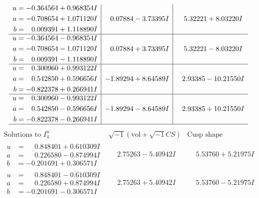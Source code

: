 \documentclass[1p]{elsarticle_modified}
\theoremstyle{definition}
\newcommand{\I}{\sqrt{-1}}
\begin{document}
$$\begin{array}{c|c|c}
\begin{aligned}
u &= -0.364564 + 0.968354 I \\
a &= -0.708654 + 1.071120 I \\
b &= \phantom{-}0.009391 + 1.118890 I\end{aligned}
 & \phantom{-}0.07884 - 3.73395 I & \phantom{-}5.32221 + 8.03220 I \\ \hline\begin{aligned}
u &= -0.364564 - 0.968354 I \\
a &= -0.708654 - 1.071120 I \\
b &= \phantom{-}0.009391 - 1.118890 I\end{aligned}
 & \phantom{-}0.07884 + 3.73395 I & \phantom{-}5.32221 - 8.03220 I \\ \hline\begin{aligned}
u &= \phantom{-}0.300960 + 0.993122 I \\
a &= \phantom{-}0.542850 + 0.596656 I \\
b &= -0.822378 + 0.266941 I\end{aligned}
 & -1.89294 + 8.64589 I & \phantom{-}2.93385 - 10.21550 I \\ \hline\begin{aligned}
u &= \phantom{-}0.300960 - 0.993122 I \\
a &= \phantom{-}0.542850 - 0.596656 I \\
b &= -0.822378 - 0.266941 I\end{aligned}
 & -1.89294 - 8.64589 I & \phantom{-}2.93385 + 10.21550 I\\
 \hline 
 \end{array}$$\newpage$$\begin{array}{c|c|c}  
\text{Solutions to }I^u_{4}& \I (\text{vol} + \sqrt{-1}CS) & \text{Cusp shape}\\
 \hline 
\begin{aligned}
u &= \phantom{-}0.848401 + 0.610309 I \\
a &= \phantom{-}0.226580 - 0.874994 I \\
b &= -0.201691 + 0.306571 I\end{aligned}
 & \phantom{-}2.75263 - 5.40942 I & \phantom{-}5.53760 + 5.21975 I \\ \hline\begin{aligned}
u &= \phantom{-}0.848401 - 0.610309 I \\
a &= \phantom{-}0.226580 + 0.874994 I \\
b &= -0.201691 - 0.306571 I\end{aligned}
 & \phantom{-}2.75263 + 5.40942 I & \phantom{-}5.53760 - 5.21975 I \\ \hline\begin{aligned}

\end{aligned}
\end{array}$$
\end{document}
